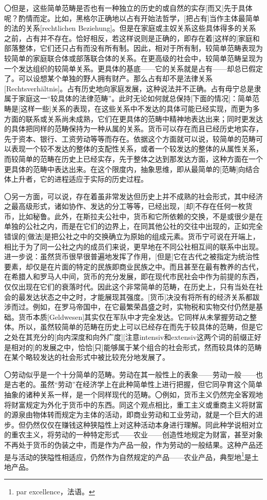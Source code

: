 \documentclass[a4paper,twoside,12pt]{ctexart}
\begin{document}
〇但是，这些简单范畴是否也有一种独立的历史的或自然的实存[而又]先于具体呢？酌情而定。比如，黑格尔正确地以占有开始法哲学，[把占有]当作主体最简单的法的关系[rechtlichen Beziehung]。但是在家庭或主奴关系这些具体得多的关系之前，占有并不存在。恰好相反，若这样说则是正确的，即存在着[这样的]家庭和部落整体，它们还只占有而没有所有制。因此，相对于所有制，较简单范畴表现为较简单的家庭联合体或部落联合体的关系。在更高级的社会中，较简单范畴呈现为一个发达组织的较简单关系。更具体的基底——它的关系就是占有——却总已假定了。可以设想某个单独的野人拥有财产。那么占有却不是法律关系[Rechtsverhältnis]。占有历史地向家庭发展，这种说法并不正确。占有毋宁总是隶属于家庭这一“较具体的法律范畴”。此时无论如何就总保持[下面的情况]：简单范畴是[这样一些]关系的表现，在这些关系中不发达的具体可能已经实现，而更为多方面的联系或关系尚未成熟，它们在更具体的范畴中精神地表达出来；同时更发达的具体把同样的范畴保持为一种从属的关系。货币可以存在而且已经历史地实存，先于资本、银行、工资劳动等等而存在。依据这个方面就可以说，较简单的范畴可以表现一个较不发达的整体的支配性关系，或者一个较发达的整体的从属性关系，而较简单的范畴在历史上已经实存，先于整体之达到那发达方面，这种方面在一个更具体的范畴中表达出来。在这个限度内，抽象思维，即从最简单的[范畴]向结合体上升者，它的进程适应于实际的历史过程。

〇另一方面，可以说，存在着虽非常发达但历史上并不成熟的社会形式，其中经济之最高级形式，诸如协作、发达的分工等等，已经出现，[却]不存在任何一枚货币，比如秘鲁。此外，在斯拉夫公社中，货币和它所依赖的交换，不是或很少是在单独的公社之内，而是在它们的边界上，在同其他公社的交往中出现的，正如完全错误的[做法]是把公社之中的交换确立为原始的组成元素。货币宁可说在开端上，相比于为了同一公社之内的成员们来说，更早地在不同公社相互间的联系中出现。进一步说：虽然货币很早很普遍地发挥了作用，[但是]它在古代之被指定为统治性要素，却仅是在片面的特定的民族即商业民族之中。而且甚至在最有教养的古代，在希腊人和罗马人中间，货币的充分发展，即在现代市民社会中作为前提的东西，仅仅出现在它们的衰落时代。因此这个非常简单的范畴，在历史上，只有当处在社会的最发达状态之中之时，才能展现其强度。[货币]决没有将所有的经济关系都跋涉而过。例如，在罗马帝国中，在它最繁荣昌盛之时，实物税和实物交付仍然是基础。货币本质[Geldwesen]其实仅在军队中才完全发达。它同样从未掌握劳动之整体。所以，虽然较简单的范畴在历史上可以已经存在而先于较具体的范畴，但是它之处在其充分的[向内深度和向外广度][注意intensiv和extensiv这两个词的前缀正好是相对的]的发展之中，恰恰[只]能够属于某个组合的社会形式，然而较具体的范畴在某个略较发达的社会形式中被比较充分地发展了。

〇劳动似乎是一个十分简单的范畴。劳动在其一般性上的表象——劳动一般——也是古老的。虽然“劳动”在经济学上在此种简单性上进行把握，但它同孕育这个简单抽象的诸种关系一样，是一个同样现代的范畴。〇例如，货币主义仍然完全客观地将财富规定为外化于货币中的东西。同这个观点相比，重工主义或重商主义将财富的源泉由物体转而规定为主体的活动，即商业劳动和工业劳动，就是一个巨大的进步。但仍然仅仅在赚钱这种狭隘性上对这种活动本身进行理解。同此种学说相对立的重农主义，将劳动的一种特定形式——农业——创造性地规定为财富，甚至对象不再处于货币的伪装之中，而是作为产品一般，作为劳动的一般结果。这种产品还是与活动的狭隘性相适应，仍然作为自然规定的产品——农业产品，典型地\footnote{par excellence，法语。}是土地产品。
\end{document}
